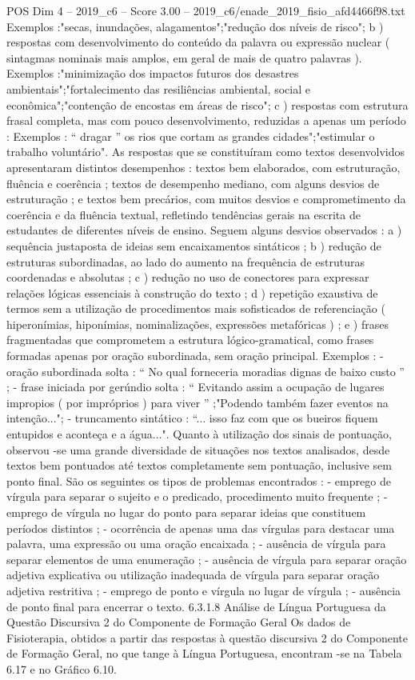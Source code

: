 \begin{textsample}{POS Dim 4 – 2019\_c6 – Score 3.00 – 2019\_c6/enade\_2019\_fisio\_afd4466f98.txt}
Exemplos :"secas, inundações, alagamentos";"redução dos níveis de risco"; b ) respostas com desenvolvimento do conteúdo da palavra ou expressão nuclear ( sintagmas nominais mais amplos, em geral de mais de quatro palavras ).
Exemplos :"minimização dos impactos futuros dos desastres ambientais";"fortalecimento das resiliências ambiental, social e econômica";"contenção de encostas em áreas de risco"; c ) respostas com estrutura frasal completa, mas com pouco desenvolvimento, reduzidas a apenas um período : Exemplos : “ dragar ” os rios que cortam as grandes cidades";"estimular o trabalho voluntário".
As respostas que se constituíram como textos desenvolvidos apresentaram distintos desempenhos : textos bem elaborados, com estruturação, fluência e coerência ; textos de desempenho mediano, com alguns desvios de estruturação ; e textos bem precários, com muitos desvios e comprometimento da coerência e da fluência textual, refletindo tendências gerais na escrita de estudantes de diferentes níveis de ensino.
Seguem alguns desvios observados : a ) sequência justaposta de ideias sem encaixamentos sintáticos ; b ) redução de estruturas subordinadas, ao lado do aumento na frequência de estruturas coordenadas e absolutas ; c ) redução no uso de conectores para expressar relações lógicas essenciais à construção do texto ; d ) repetição exaustiva de termos sem a utilização de procedimentos mais sofisticados de referenciação ( hiperonímias, hiponímias, nominalizações, expressões metafóricas ) ; e ) frases fragmentadas que comprometem a estrutura lógico-gramatical, como frases formadas apenas por oração subordinada, sem oração principal.
Exemplos : - oração subordinada solta : “ No qual forneceria moradias dignas de baixo custo ” ; - frase iniciada por gerúndio solta : “ Evitando assim a ocupação de lugares impropios ( por impróprios ) para viver ” ;"Podendo também fazer eventos na intenção..."; - truncamento sintático : “... isso faz com que os bueiros fiquem entupidos e aconteça e a água...".
Quanto à utilização dos sinais de pontuação, observou -se uma grande diversidade de situações nos textos analisados, desde textos bem pontuados até textos completamente sem pontuação, inclusive sem ponto final.
São os seguintes os tipos de problemas encontrados : - emprego de vírgula para separar o sujeito e o predicado, procedimento muito frequente ; - emprego de vírgula no lugar do ponto para separar ideias que constituem períodos distintos ; - ocorrência de apenas uma das vírgulas para destacar uma palavra, uma expressão ou uma oração encaixada ; - ausência de vírgula para separar elementos de uma enumeração ; - ausência de vírgula para separar oração adjetiva explicativa ou utilização inadequada de vírgula para separar oração adjetiva restritiva ; - emprego de ponto e vírgula no lugar de vírgula ; - ausência de ponto final para encerrar o texto. 6.3.1.8 Análise de Língua Portuguesa da Questão Discursiva 2 do Componente de Formação Geral Os dados de Fisioterapia, obtidos a partir das respostas à questão discursiva 2 do Componente de Formação Geral, no que tange à Língua Portuguesa, encontram -se na Tabela 6.17 e no Gráfico 6.10.

\end{textsample}
